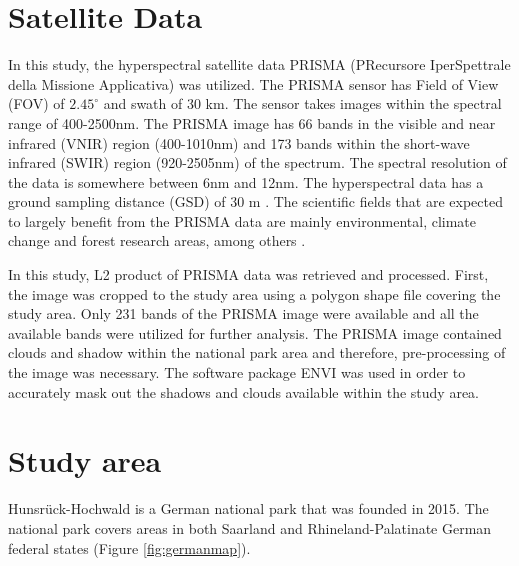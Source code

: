 \documentclass[a4paper, twoside]{templates/ociamthesis}
\begin{document}
\hypertarget{satellite-data}{%
\section{Satellite Data}\label{satellite-data}}

In this study, the hyperspectral satellite data PRISMA (PRecursore IperSpettrale della Missione Applicativa) was utilized. The PRISMA sensor has Field of View (FOV) of \(2.45^{\circ}\) and swath of 30 km. The sensor takes images within the spectral range of 400-2500nm. The PRISMA image has 66 bands in the visible and near infrared (VNIR) region (400-1010nm) and 173 bands within the short-wave infrared (SWIR) region (920-2505nm) of the spectrum. The spectral resolution of the data is somewhere between 6nm and 12nm. The hyperspectral data has a ground sampling distance (GSD) of 30 m \citep{candela2016prisma, giardino2020first, verrelst2021mapping}. The scientific fields that are expected to largely benefit from the PRISMA data are mainly environmental, climate change and forest research areas, among others \citep{giardino2020first}.

In this study, L2 product of PRISMA data was retrieved and processed. First, the image was cropped to the study area using a polygon shape file covering the study area. Only 231 bands of the PRISMA image were available and all the available bands were utilized for further analysis. The PRISMA image contained clouds and shadow within the national park area and therefore, pre-processing of the image was necessary. The software package ENVI was used in order to accurately mask out the shadows and clouds available within the study area.

\hypertarget{study-area}{%
\section{Study area}\label{study-area}}

Hunsrück-Hochwald is a German national park that was founded in 2015. The national park covers areas in both Saarland and Rhineland-Palatinate German federal states (Figure \ref{fig:germanmap}).
\end{document}
